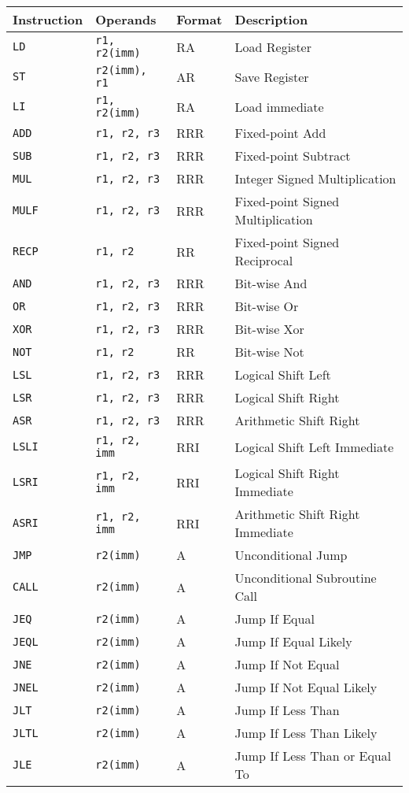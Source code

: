 \begin{table}[ht]\small
\begin{tabular}{llll}
Instruction & Operands & Format & Description\\\hline
\tt LD&\tt r1, r2(imm)&RA&Load Register\\
\tt ST&\tt r2(imm), r1&AR&Save Register\\
\tt LI&\tt r1, r2(imm)&RA&Load immediate\medskip\\
\tt ADD&\tt r1, r2, r3&RRR&Fixed-point Add\\
\tt SUB&\tt r1, r2, r3&RRR&Fixed-point Subtract\\
\tt MUL&\tt r1, r2, r3&RRR&Integer Signed Multiplication\\
\tt MULF&\tt r1, r2, r3&RRR&Fixed-point Signed Multiplication\\
\tt RECP&\tt r1, r2&RR&Fixed-point Signed Reciprocal\\
\tt AND&\tt r1, r2, r3&RRR&Bit-wise And\\
\tt OR&\tt r1, r2, r3&RRR&Bit-wise Or\\
\tt XOR&\tt r1, r2, r3&RRR&Bit-wise Xor\\
\tt NOT&\tt r1, r2&RR&Bit-wise Not\\
\tt LSL&\tt r1, r2, r3&RRR&Logical Shift Left\\
\tt LSR&\tt r1, r2, r3&RRR&Logical Shift Right\\
\tt ASR&\tt r1, r2, r3&RRR&Arithmetic Shift Right\\
\tt LSLI&\tt r1, r2, imm&RRI&Logical Shift Left Immediate\\
\tt LSRI&\tt r1, r2, imm&RRI&Logical Shift Right Immediate\\
\tt ASRI&\tt r1, r2, imm&RRI&Arithmetic Shift Right Immediate\medskip\\
\tt JMP&\tt r2(imm)&A&Unconditional Jump\\
\tt CALL&\tt r2(imm)&A&Unconditional Subroutine Call\\
\tt JEQ&\tt r2(imm)&A&Jump If Equal\\
\tt JEQL&\tt r2(imm)&A&Jump If Equal Likely\\
\tt JNE&\tt r2(imm)&A&Jump If Not Equal\\
\tt JNEL&\tt r2(imm)&A&Jump If Not Equal Likely\\
\tt JLT&\tt r2(imm)&A&Jump If Less Than\\
\tt JLTL&\tt r2(imm)&A&Jump If Less Than Likely\\
\tt JLE&\tt r2(imm)&A&Jump If Less Than or Equal To\\

\end{tabular}
\end{table}

